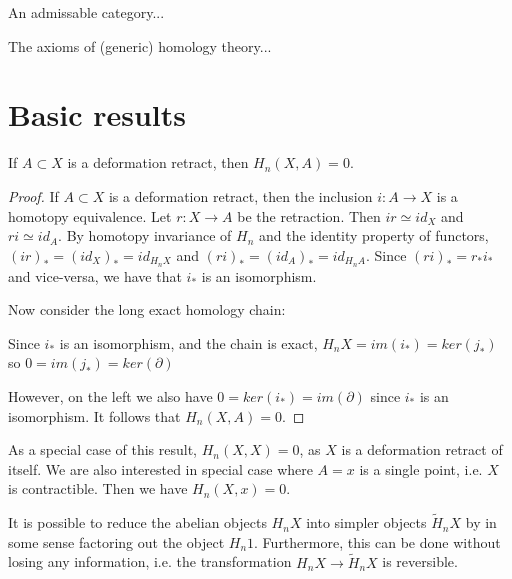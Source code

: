 An admissable category...

The axioms of (generic) homology theory...

\section{Basic results}
\begin{prop}
If $A\subset X$ is a deformation retract, then $H_n(X,A)=0$.
\end{prop}
\begin{proof}
If $A\subset X$ is a deformation retract, then the inclusion $i:A\rightarrow X$ is a homotopy equivalence. Let $r:X\rightarrow A$ be the retraction. Then $ir\simeq id_X$ and $ri\simeq id_A$.
By homotopy invariance of $H_n$ and the identity property of functors, $(ir)_*=(id_{X})_*=id_{H_nX}$ and $(ri)_*=(id_{A})_*=id_{H_nA}$. Since $(ri)_*=r_*i_*$ and vice-versa, we have that $i_*$ is an isomorphism.

Now consider the long exact homology chain:



Since $i_*$ is an isomorphism, and the chain is exact, $H_nX=im(i_*)=ker(j_*)$ so $0=im(j_*)=ker(\partial)$

However, on the left we also have $0=ker(i_*)=im(\partial)$ since $i_*$ is an isomorphism. It follows that $H_n(X,A)=0$.

\end{proof}

\begin{remark}
\label{contractible-0}
As a special case of this result, $H_n(X,X)=0$, as $X$ is a deformation retract of itself. We are also interested in special case where $A=x$ is a single point, i.e. $X$ is contractible. Then we have $H_n(X,x)=0$.
\end{remark}

It is possible to reduce the abelian objects $H_nX$ into simpler objects $\tilde{H}_nX$ by in some sense factoring out the object $H_n1$. Furthermore, this can be done without losing any information, i.e. the transformation $H_nX\rightarrow \tilde{H}_nX$ is reversible.

